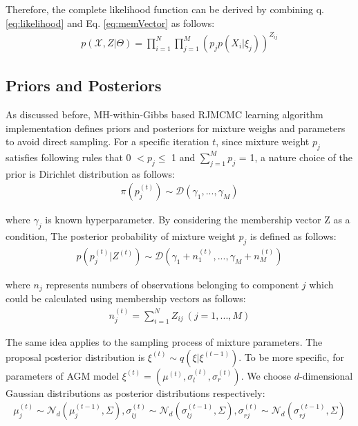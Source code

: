 \documentclass[conference]{IEEEtran}
\begin{document}
Therefore, the complete likelihood function can be derived by combining q. \eqref{eq:likelihood} and Eq. \eqref{eq:memVector} as follows:
\begin{align}
p(\mathcal{X}, Z|\Theta) = \prod_{i=1}^{N}\prod_{j=1}^{M}(p_jp(X_i|\xi_j))^{Z_{ij}}
\label{eq:compPdf}
\end{align}

\subsection{Priors and Posteriors}
As discussed before, MH-within-Gibbs based RJMCMC learning algorithm implementation defines priors and posteriors for mixture weighs and parameters to avoid direct sampling. For a specific iteration $t$, since mixture weight $p_j$ satisfies following rules that 0 $< p_j \leq$ 1 and $\sum_{j=1}^Mp_j$ = 1, a nature choice of the prior is Dirichlet distribution\cite{b10} as follows:
\begin{align}
\pi(p_j^{(t)}) \sim \mathcal{D}(\gamma_1,...,\gamma_M )
\label{eq:priorWeight}
\end{align}

where $\gamma_j$ is known hyperparameter. By considering the membership vector Z as a condition, The posterior probability of mixture weight $p_j$ is defined as follows:
\begin{align}
p(p_j^{(t)}|Z^{(t)}) \sim \mathcal{D}(\gamma_1 + n_1^{(t)},...,\gamma_M + n_M^{(t)})
\label{eq:posterWeight}
\end{align}

where $n_j$ represents numbers of observations belonging to component $j$ which could be calculated using membership vectors as follows:
\begin{align}
n_j^{(t)} = \sum_{i=1}^NZ_{ij}\ (j = 1,...,M) 
\label{eq:nj}
\end{align}

The same idea applies to the sampling process of mixture parameters. The proposal posterior distribution is  $\xi^{(t)} \sim q(\xi|\xi^{(t-1)})$. To be more specific, for parameters of AGM model $\xi^{(t)} = (\mu^{(t)}, \sigma_{l}^{(t)}, \sigma_{r}^{(t)})$. We choose $d$-dimensional Gaussian distributions as posterior distributions respectively:
\begin{align}
\mu_j^{(t)} \sim \mathcal{N}_d(\mu_j^{(t-1)},\Sigma),
\sigma_{lj}^{(t)} \sim \mathcal{N}_d(\sigma_{lj}^{(t-1)},\Sigma),
\sigma_{rj}^{(t)} \sim \mathcal{N}_d(\sigma_{rj}^{(t-1)},\Sigma)
\label{eq:posters}
\end{align}
\end{document}
